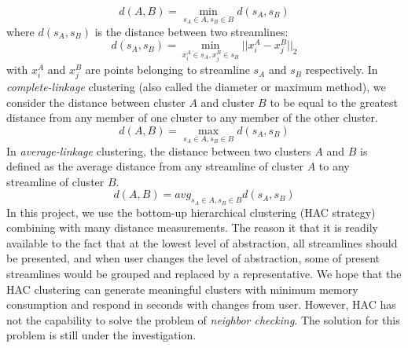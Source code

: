 \begin{equation}
\label{eq:distance_single_linkage}
d(A, B) = \min_{s_A \in {A},s_B \in {B}} d(s_A,s_B)
\end{equation}
where $d(s_A,s_B)$ is the distance between two streamlines:
\begin{equation}
\label{eq:distance_point_streamline}
d(s_A, s_B) = \min_{x_i^A \in s_A, x_j^B \in s_B}||{x}_i^A -{x}_j^B||_2
\end{equation}
with $x_i^A$ and $x_j^B$ are points belonging to streamline $s_A$ and $s_B$ respectively. 
In \emph{complete-linkage} clustering (also called the diameter or maximum method), we consider the distance between cluster $A$ and cluster $B$ to be equal to the greatest distance from any member of one cluster to any member of the other cluster.
\begin{equation}
\label{eq:distance_complete_linkage}
d(A, B) = \max_{s_A \in {A},s_B \in {B}} d(s_A,s_B)
\end{equation}
In \emph{average-linkage} clustering, the distance between two clusters $A$ and $B$ is defined as the average distance from any streamline of cluster $A$ to any streamline of cluster $B$.
\begin{equation}
\label{eq:distance_average_linkage}
d(A, B) = avg_{s_A \in {A},s_B \in {B}} d(s_A,s_B)
\end{equation}
In this project, we use the bottom-up hierarchical clustering (HAC strategy) combining with many distance measurements. The reason it that it is readily available to the fact that at the lowest level of abstraction, all streamlines should be presented, and when user changes the level of abstraction, some of present streamlines would be grouped and replaced by a representative. We hope that the HAC clustering can generate meaningful clusters with minimum memory consumption and respond in seconds with changes from user. However, HAC has not the capability to solve the problem of \emph{neighbor checking}. The solution for this problem is still under the investigation.
